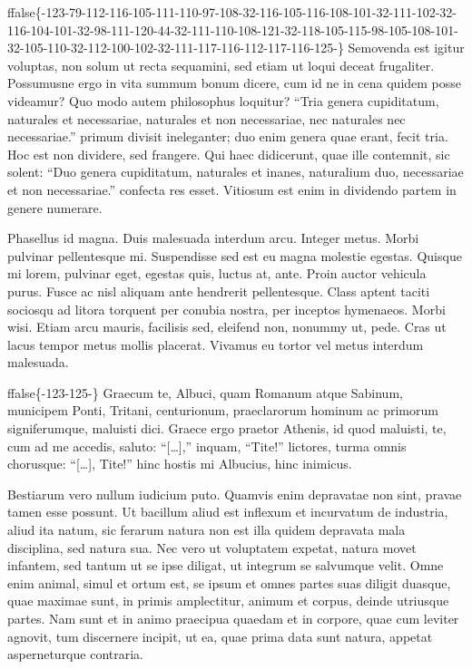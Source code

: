 \documentclass[twoside]{extreport}
\begin{document}
\begin{alertblock}{}
ffalse\{-123-79-112-116-105-111-110-97-108-32-116-105-116-108-101-32-111-102-32-116-104-101-32-98-111-120-44-32-111-110-108-121-32-118-105-115-98-105-108-101-32-105-110-32-112-100-102-32-111-117-116-112-117-116-125-\}\fi{}
Semovenda est igitur voluptas, non solum ut recta
sequamini, sed etiam ut loqui deceat frugaliter. Possumusne ergo in vita
summum bonum dicere, cum id ne in cena quidem posse videamur? Quo modo
autem philosophus loquitur? ``Tria genera cupiditatum, naturales et
necessariae, naturales et non necessariae, nec naturales nec
necessariae.'' primum divisit ineleganter; duo enim genera quae erant,
fecit tria. Hoc est non dividere, sed frangere. Qui haec didicerunt,
quae ille contemnit, sic solent: ``Duo genera cupiditatum, naturales et
inanes, naturalium duo, necessariae et non necessariae.'' confecta res
esset. Vitiosum est enim in dividendo partem in genere numerare.

Phasellus id magna. Duis malesuada interdum arcu.
Integer metus. Morbi pulvinar pellentesque mi. Suspendisse sed est eu
magna molestie egestas. Quisque mi lorem, pulvinar eget, egestas quis,
luctus at, ante. Proin auctor vehicula purus. Fusce ac nisl aliquam ante
hendrerit pellentesque. Class aptent taciti sociosqu ad litora torquent
per conubia nostra, per inceptos hymenaeos. Morbi wisi. Etiam arcu
mauris, facilisis sed, eleifend non, nonummy ut, pede. Cras ut lacus
tempor metus mollis placerat. Vivamus eu tortor vel metus interdum
malesuada.
\end{alertblock}




















\begin{alertblock}{}
ffalse\{-123-125-\}\fi{} Graecum te, Albuci, quam Romanum atque Sabinum,
municipem Ponti, Tritani, centurionum, praeclarorum hominum ac primorum
signiferumque, maluisti dici. Graece ergo praetor Athenis, id quod
maluisti, te, cum ad me accedis, saluto: ``{[}\ldots{]},'' inquam,
``Tite!'' lictores, turma omnis chorusque: ``{[}\ldots{]}, Tite!'' hinc
hostis mi Albucius, hinc inimicus.

Bestiarum vero nullum iudicium puto. Quamvis enim
depravatae non sint, pravae tamen esse possunt. Ut bacillum aliud est
inflexum et incurvatum de industria, aliud ita natum, sic ferarum natura
non est illa quidem depravata mala disciplina, sed natura sua. Nec vero
ut voluptatem expetat, natura movet infantem, sed tantum ut se ipse
diligat, ut integrum se salvumque velit. Omne enim animal, simul et
ortum est, se ipsum et omnes partes suas diligit duasque, quae maximae
sunt, in primis amplectitur, animum et corpus, deinde utriusque partes.
Nam sunt et in animo praecipua quaedam et in corpore, quae cum leviter
agnovit, tum discernere incipit, ut ea, quae prima data sunt natura,
appetat asperneturque contraria.
\end{alertblock}
\end{document}

